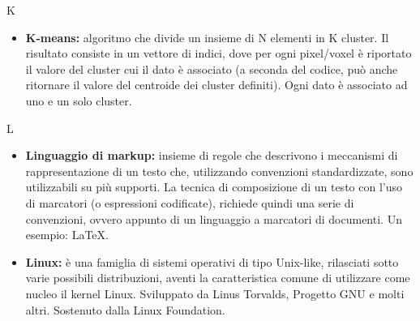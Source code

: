 \Huge K
\normalsize
\begin{itemize}
	\item\textbf{K-means:} algoritmo che divide un insieme di N elementi in K cluster. Il risultato consiste in un vettore di indici, dove per ogni pixel\glossario{}/voxel\glossario{} è riportato il valore del cluster cui il dato è associato (a seconda del codice, può anche ritornare il valore del centroide dei cluster\glossario{} definiti). Ogni dato è associato ad uno e un solo cluster\glossario{}.
\end{itemize}
\pagebreak

\Huge L
\normalsize
\begin{itemize}
\item \textbf{Linguaggio di markup:} insieme di regole che descrivono i meccanismi di rappresentazione di un testo che, utilizzando convenzioni standardizzate, sono utilizzabili su più supporti. La tecnica di composizione di un testo con l’uso di marcatori (o espressioni codificate), richiede quindi una serie di convenzioni, ovvero appunto di un linguaggio a marcatori di documenti. Un esempio: \LaTeX.

\item \textbf{Linux:} è una famiglia di sistemi operativi di tipo Unix-like, rilasciati sotto varie possibili distribuzioni, aventi la caratteristica comune di utilizzare come nucleo il kernel Linux. Sviluppato da Linus Torvalds, Progetto GNU e molti altri. Sostenuto dalla Linux Foundation.
\end{itemize}
\pagebreak

